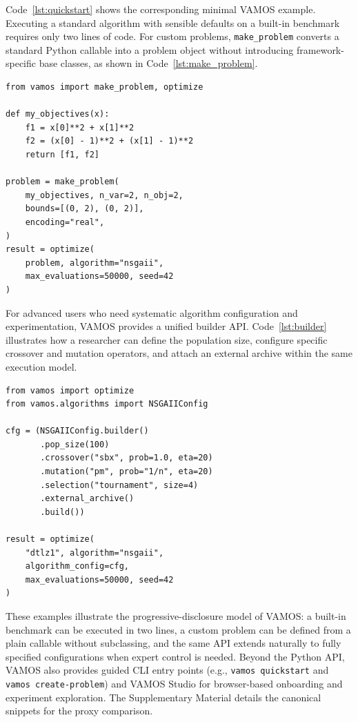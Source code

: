 \documentclass[final,5p,times,twocolumn]{elsarticle}
\newcommand{\VAMOS}{VAMOS}
\begin{document}
Code~\ref{lst:quickstart} shows the corresponding minimal \VAMOS{} example. Executing a standard algorithm with sensible defaults on a built-in benchmark requires only two lines of code. For custom problems, \texttt{make\_problem} converts a standard Python callable into a problem object without introducing framework-specific base classes, as shown in Code~\ref{lst:make_problem}.
\begin{lstlisting}[float=!ht,caption={Defining and optimizing a custom MOP in \VAMOS{}.},label={lst:make_problem}]
from vamos import make_problem, optimize

def my_objectives(x):
    f1 = x[0]**2 + x[1]**2
    f2 = (x[0] - 1)**2 + (x[1] - 1)**2
    return [f1, f2]

problem = make_problem(
    my_objectives, n_var=2, n_obj=2,
    bounds=[(0, 2), (0, 2)],
    encoding="real",
)
result = optimize(
    problem, algorithm="nsgaii",
    max_evaluations=50000, seed=42
)
\end{lstlisting}

For advanced users who need systematic algorithm configuration and experimentation, \VAMOS{} provides a unified builder API. Code~\ref{lst:builder} illustrates how a researcher can define the population size, configure specific crossover and mutation operators, and attach an external archive within the same execution model.

\begin{lstlisting}[float=tbp,caption={Using the builder API for fine-grained configuration in \VAMOS{}.},label={lst:builder}]
from vamos import optimize
from vamos.algorithms import NSGAIIConfig

cfg = (NSGAIIConfig.builder()
       .pop_size(100)
       .crossover("sbx", prob=1.0, eta=20)
       .mutation("pm", prob="1/n", eta=20)
       .selection("tournament", size=4)
       .external_archive()
       .build())

result = optimize(
    "dtlz1", algorithm="nsgaii",
    algorithm_config=cfg,
    max_evaluations=50000, seed=42
)
\end{lstlisting}

These examples illustrate the progressive-disclosure model of \VAMOS{}: a built-in benchmark can be executed in two lines, a custom problem can be defined from a plain callable without subclassing, and the same API extends naturally to fully specified configurations when expert control is needed. Beyond the Python API, \VAMOS{} also provides guided CLI entry points (e.g., \texttt{vamos quickstart} and \texttt{vamos create-problem}) and VAMOS Studio for browser-based onboarding and experiment exploration. The Supplementary Material details the  canonical snippets  for the proxy comparison.
\end{document}

